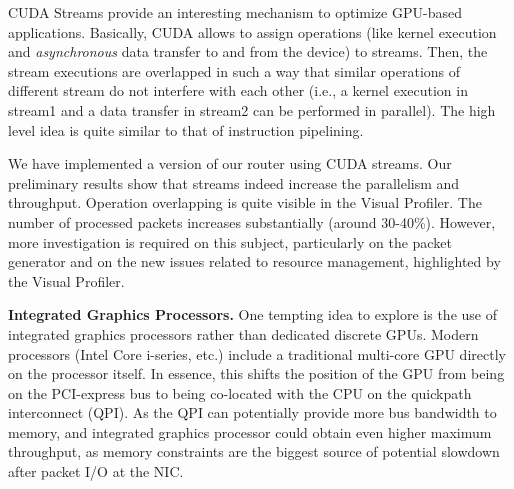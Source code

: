 CUDA Streams provide an interesting mechanism to optimize GPU-based
applications. Basically, CUDA allows to assign operations (like kernel
execution and \emph{asynchronous} data transfer to and from the device) to
streams. Then, the stream executions are overlapped in such a way that similar
operations of different stream do not interfere with each other (i.e., a kernel
execution in stream1 and a data transfer in stream2 can be performed in
parallel). The high level idea is quite similar to that of instruction
pipelining.

We have implemented a version of our router using CUDA streams. Our preliminary
results show that streams indeed increase the parallelism and throughput.
Operation overlapping is quite visible in the Visual Profiler. The number of
processed packets increases substantially (around 30-40\%). However, more
investigation is required on this subject, particularly on the packet generator
and on the new issues related to resource management, highlighted by the Visual
Profiler.


\medskip \noindent \textbf{Integrated Graphics Processors.} One tempting idea
to explore is the use of integrated graphics processors rather than dedicated
discrete GPUs. Modern processors (Intel Core i-series, etc.) include a
traditional multi-core GPU directly on the processor itself. In essence, this
shifts the position of the GPU from being on the PCI-express bus to being
co-located with the CPU on the quickpath interconnect (QPI). As the QPI can
potentially provide more bus bandwidth to memory, and integrated graphics
processor could obtain even higher maximum throughput, as memory constraints
are the biggest source of potential slowdown after packet I/O at the NIC.
